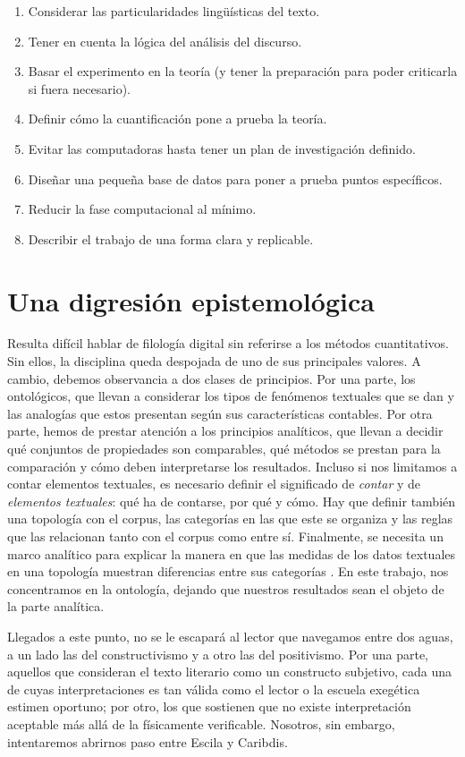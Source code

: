 \begin{enumerate}
	\item Considerar las particularidades lingüísticas del texto.
	\item Tener en cuenta la lógica del análisis del discurso.
	\item Basar el experimento en la teoría (y tener la preparación para poder criticarla si fuera necesario).
	\item Definir cómo la cuantificación pone a prueba la teoría.
	\item Evitar las computadoras hasta tener un plan de investigación definido.
	\item Diseñar una pequeña base de datos para poner a prueba puntos específicos.
	\item Reducir la fase computacional al mínimo.
	\item Describir el trabajo de una forma clara y replicable.
\end{enumerate}

\section{Una digresión epistemológica}
Resulta difícil hablar de filología digital sin referirse a los métodos cuantitativos. Sin ellos, la disciplina queda despojada de uno de sus principales valores. A cambio, debemos observancia a dos clases de principios. Por una parte, los ontológicos, que llevan a considerar los tipos de fenómenos textuales que se dan y las analogías que estos presentan según sus características contables. Por otra parte, hemos de prestar atención a los principios analíticos, que llevan a decidir qué conjuntos de propiedades son comparables, qué métodos se prestan para la comparación y cómo deben interpretarse los resultados. Incluso si nos limitamos a contar elementos textuales, es necesario definir el significado de \textit{contar} y de \textit{elementos textuales}: qué ha de contarse, por qué y cómo. Hay que definir también una topología con el corpus, las categorías en las que este se organiza y las reglas que las relacionan tanto con el corpus como entre sí. Finalmente, se necesita un marco analítico para explicar la manera en que las medidas de los datos textuales en una topología muestran diferencias entre sus categorías \parencite{gavin2022}. En este trabajo, nos concentramos en la ontología, dejando que nuestros resultados sean el objeto de la parte analítica.

Llegados a este punto, no se le escapará al lector que navegamos entre dos aguas, a un lado las del constructivismo y a otro las del positivismo. Por una parte, aquellos que consideran el texto literario como un constructo subjetivo, cada una de cuyas interpretaciones es tan válida como el lector o la escuela exegética estimen oportuno; por otro, los que sostienen que no existe interpretación aceptable más allá de la físicamente verificable. Nosotros, sin embargo, intentaremos abrirnos paso entre Escila y Caribdis.

